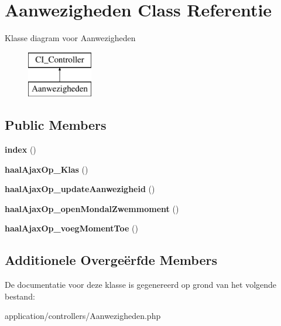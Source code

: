 \hypertarget{class_aanwezigheden}{}\section{Aanwezigheden Class Referentie}
\label{class_aanwezigheden}
Klasse diagram voor Aanwezigheden\begin{figure}[H]
\begin{center}
\leavevmode
\includegraphics[height=2.000000cm]{class_aanwezigheden}
\end{center}
\end{figure}
\subsection*{Public Members}
\begin{DoxyCompactItemize}
\item 
\mbox{\label{class_aanwezigheden_a149eb92716c1084a935e04a8d95f7347}} 
{\bfseries index} ()
\item 
\mbox{\label{class_aanwezigheden_a1fb2c02d78578c407109f8a7010e1f39}} 
{\bfseries haal\+Ajax\+Op\+\_\+\+Klas} ()
\item 
\mbox{\label{class_aanwezigheden_a84485f31fe61859c15290264ebbac55c}} 
{\bfseries haal\+Ajax\+Op\+\_\+update\+Aanwezigheid} ()
\item 
\mbox{\label{class_aanwezigheden_aa8684999a3d3ec0d1c04e2bad56b9e02}} 
{\bfseries haal\+Ajax\+Op\+\_\+open\+Mondal\+Zwemmoment} ()
\item 
\mbox{\label{class_aanwezigheden_a7e21b9ebf7afb3bed115c97c03e5377c}} 
{\bfseries haal\+Ajax\+Op\+\_\+voeg\+Moment\+Toe} ()
\end{DoxyCompactItemize}
\subsection*{Additionele Overge\"{e}rfde Members}


De documentatie voor deze klasse is gegenereerd op grond van het volgende bestand\+:\begin{DoxyCompactItemize}
\item 
application/controllers/Aanwezigheden.\+php\end{DoxyCompactItemize}
